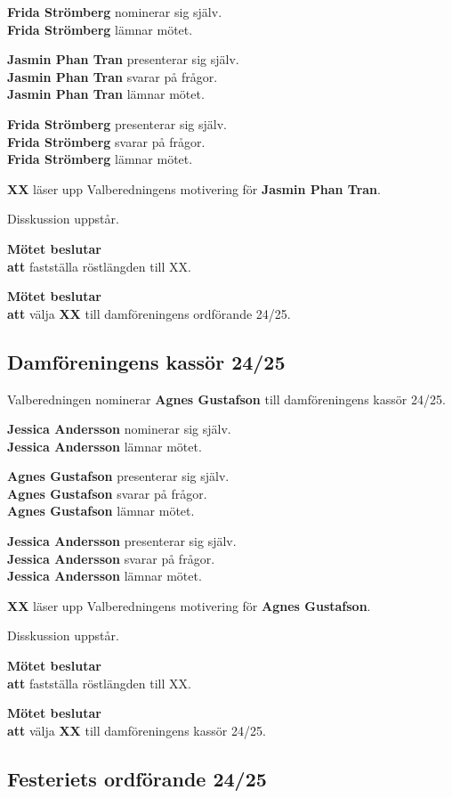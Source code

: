 \documentclass{datateknologsektionen-document}
\newcommand{\ind}{\hspace*{2em}}
\newcommand{\motetbeslutar}{\textbf{Mötet beslutar}}
\newcommand{\att}{\\\ind\textbf{att}}
\begin{document}
\textbf{Frida Strömberg} nominerar sig själv. \\
\textbf{Frida Strömberg} lämnar mötet.

\textbf{Jasmin Phan Tran} presenterar sig själv.\\
\textbf{Jasmin Phan Tran} svarar på frågor.\\
\textbf{Jasmin Phan Tran} lämnar mötet.

\textbf{Frida Strömberg} presenterar sig själv.\\
\textbf{Frida Strömberg} svarar på frågor.\\
\textbf{Frida Strömberg} lämnar mötet.

\textbf{XX} läser upp Valberedningens motivering för \textbf{Jasmin Phan Tran}.

Disskussion uppstår.

\motetbeslutar
\att{} fastställa röstlängden till XX.

\motetbeslutar
\att{} välja \textbf{XX} till damföreningens ordförande 24/25.

\subsection{Damföreningens kassör 24/25}

Valberedningen nominerar \textbf{Agnes Gustafson} till damföreningens kassör 24/25.

\textbf{Jessica Andersson} nominerar sig själv. \\
\textbf{Jessica Andersson} lämnar mötet.

\textbf{Agnes Gustafson} presenterar sig själv.\\
\textbf{Agnes Gustafson} svarar på frågor.\\
\textbf{Agnes Gustafson} lämnar mötet.

\textbf{Jessica Andersson} presenterar sig själv.\\
\textbf{Jessica Andersson} svarar på frågor.\\
\textbf{Jessica Andersson} lämnar mötet.

\textbf{XX} läser upp Valberedningens motivering för \textbf{Agnes Gustafson}.

Disskussion uppstår.

\motetbeslutar
\att{} fastställa röstlängden till XX.

\motetbeslutar
\att{} välja \textbf{XX} till damföreningens kassör 24/25.

\subsection{Festeriets ordförande 24/25}
\end{document}
